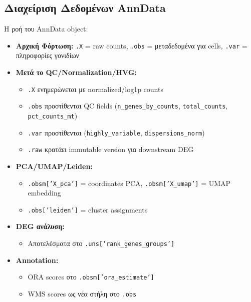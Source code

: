 \documentclass[12pt, a4paper]{article}
\begin{document}
\subsection{Διαχείριση Δεδομένων AnnData}
Η ροή του AnnData object:
\begin{itemize}
    \item \textbf{Αρχική Φόρτωση:} \texttt{.X} = raw counts, \texttt{.obs} = μεταδεδομένα για cells, \texttt{.var} = πληροφορίες γονιδίων
    \item \textbf{Μετά το QC/Normalization/HVG:}
        \begin{itemize}
            \item \texttt{.X} ενημερώνεται με normalized/log1p counts
            \item \texttt{.obs} προστίθενται QC fields (\texttt{n\_genes\_by\_counts}, \texttt{total\_counts}, \texttt{pct\_counts\_mt})
            \item \texttt{.var} προστίθενται (\texttt{highly\_variable}, \texttt{dispersions\_norm})
            \item \texttt{.raw} κρατάει immutable version για downstream DEG
        \end{itemize}
    \item \textbf{PCA/UMAP/Leiden:}
        \begin{itemize}
            \item \texttt{.obsm['X\_pca']} = coordinates PCA, \texttt{.obsm['X\_umap']} = UMAP embedding
            \item \texttt{.obs['leiden']} = cluster assignments
        \end{itemize}
    \item \textbf{DEG ανάλυση:}
        \begin{itemize}
            \item Αποτελέσματα στο \texttt{.uns['rank\_genes\_groups']}
        \end{itemize}
    \item \textbf{Annotation:}
        \begin{itemize}
            \item ORA scores στο \texttt{.obsm['ora\_estimate']}
            \item WMS scores ως νέα στήλη στο \texttt{.obs}
        \end{itemize}
\end{itemize}
\end{document}
